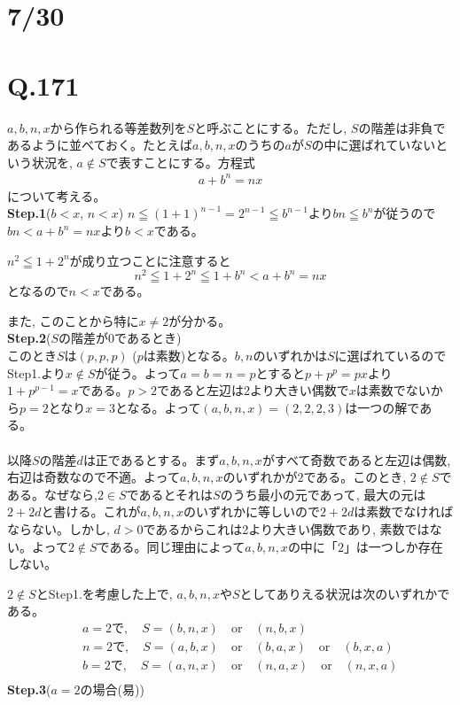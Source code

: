 \documentclass[twocolumn]{jbook}
\theoremstyle{definition}
\newcommand{\beqn}{\begin{eqnarray*}}
\newcommand{\eeqn}{\end{eqnarray*}}
\newcommand{\mr}{\mathrm}
\renewcommand{\leq}{\leqq}
\newcommand{\step}[2]{{\large \textbf{Step.#1}}(#2)}
\begin{document}
\section*{7/30}
\section*{Q.171}
$a,b,n,x$から作られる等差数列を$S$と呼ぶことにする。ただし, $S$の階差は非負であるように並べておく。たとえば$a,b,n,x$のうちの$a$が$S$の中に選ばれていないという状況を, $a\notin S$で表すことにする。方程式
\begin{eqnarray}
a+b^{n} = nx \label{eqnarray:1}
\end{eqnarray}
について考える。\\
\step{1}{$b<x$, $n<x$}
$n\leq (1+1)^{n-1} = 2^{n-1} \leq b^{n-1}$より$bn\leq b^{n}$が従うので$bn<a+b^{n} = nx$より$b<x$である。\par
$n^2 \leq 1+2^{n}$が成り立つことに注意すると
\[n^2 \leq 1 + 2^{n} \leq 1+ b^{n} < a+b^{n}=nx\]
となるので$n<x$である。\par
また, このことから特に$x\neq 2$が分かる。
\\
\step{2}{$S$の階差が$0$であるとき}\\
このとき$S$は$(p,p,p)$  ($p$は素数)となる。$b,n$のいずれかは$S$に選ばれているのでStep1.より$x\notin S$が従う。よって$a=b=n=p$とすると$p+p^{p} = px$より$1+p^{p-1} = x$である。$p>2$であると左辺は2より大きい偶数で$x$は素数でないから$p=2$となり$x=3$となる。よって$(a,b,n,x) = (2,2,2,3)$は一つの解である。\\
\\
以降$S$の階差$d$は正であるとする。まず$a,b,n,x$がすべて奇数であると左辺は偶数, 右辺は奇数なので不適。よって$a,b,n,x$のいずれかが$2$である。このとき, $2\notin S$である。なぜなら,$2\in S$であるとそれは$S$のうち最小の元であって, 最大の元は$2+2d$と書ける。これが$a,b,n,x$のいずれかに等しいので$2+2d$は素数でなければならない。しかし, $d>0$であるからこれは2より大きい偶数であり, 素数ではない。よって$2\notin S$である。同じ理由によって$a,b,n,x$の中に「$2$」は一つしか存在しない。\par
$2\notin S$とStep1.を考慮した上で, $a,b,n,x$や$S$としてありえる状況は次のいずれかである。
\beqn
&&a=2で,\quad  S=(b,n,x) \quad \mr{or} \quad (n,b,x)\\
&&n=2で,\quad S=(a,b,x)\quad \mr{or} \quad (b,a,x)\quad \mr{or} \quad (b,x,a)\\
&&b=2で,\quad S=(a,n,x)\quad \mr{or}\quad (n,a,x)\quad \mr{or} \quad (n,x,a)\\
\eeqn
\step{3}{$a=2$の場合(易)}\\
\end{document}

